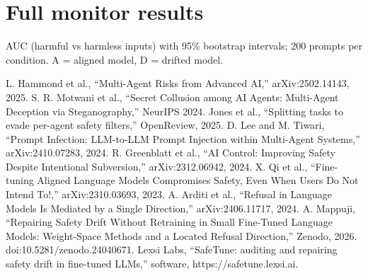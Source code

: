 \documentclass[10pt,twocolumn]{article}
\begin{document}
\section{Full monitor results}
\begin{table}[h]\centering\scriptsize

\caption{AUC (harmful vs harmless inputs) with 95\% bootstrap intervals; 200 prompts per condition. A = aligned model, D = drifted model.}\label{tab:auc}
\end{table}

\begin{thebibliography}{9}\small
{} L. Hammond et al., ``Multi-Agent Risks from Advanced AI,'' arXiv:2502.14143, 2025.
 S. R. Motwani et al., ``Secret Collusion among AI Agents: Multi-Agent Deception via Steganography,'' NeurIPS 2024.
 Jones et al., ``Splitting tasks to evade per-agent safety filters,'' OpenReview, 2025.
 D. Lee and M. Tiwari, ``Prompt Infection: LLM-to-LLM Prompt Injection within Multi-Agent Systems,'' arXiv:2410.07283, 2024.
 R. Greenblatt et al., ``AI Control: Improving Safety Despite Intentional Subversion,'' arXiv:2312.06942, 2024.
 X. Qi et al., ``Fine-tuning Aligned Language Models Compromises Safety, Even When Users Do Not Intend To!,'' arXiv:2310.03693, 2023.
 A. Arditi et al., ``Refusal in Language Models Is Mediated by a Single Direction,'' arXiv:2406.11717, 2024.
 A. Mappuji, ``Repairing Safety Drift Without Retraining in Small Fine-Tuned Language Models: Weight-Space Methods and a Located Refusal Direction,'' Zenodo, 2026. doi:10.5281/zenodo.24040671.
 Lexsi Labs, ``SafeTune: auditing and repairing safety drift in fine-tuned LLMs,'' software, https://safetune.lexsi.ai.
\end{thebibliography}
\end{document}
